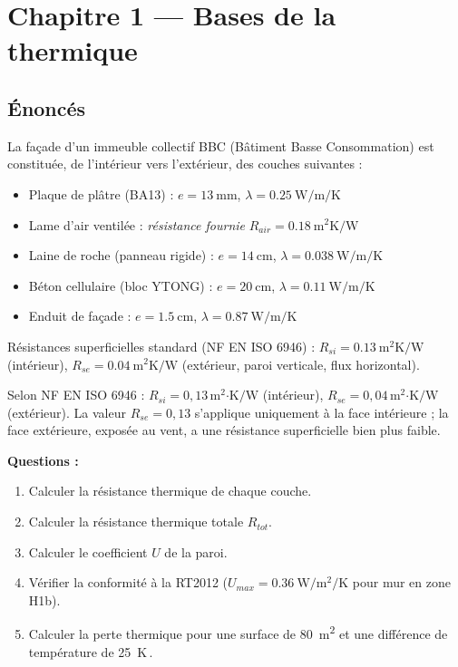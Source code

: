 \chapter*{Chapitre 1 — Bases de la thermique}

\section*{Énoncés}


La façade d'un immeuble collectif BBC (Bâtiment Basse Consommation) est constituée,
de l'intérieur vers l'extérieur, des couches suivantes :
\begin{itemize}
  \item Plaque de plâtre (BA13) : \(e = \SI{13}{\milli\meter}\), \(\lambda = \SI{0,25}{\watt\per\meter\per\kelvin}\)
  \item Lame d'air ventilée : \textit{résistance fournie} \(R_{air} = \SI{0,18}{\meter\squared\kelvin\per\watt}\)
  \item Laine de roche (panneau rigide) : \(e = \SI{14}{\centi\meter}\), \(\lambda = \SI{0,038}{\watt\per\meter\per\kelvin}\)
  \item Béton cellulaire (bloc YTONG) : \(e = \SI{20}{\centi\meter}\), \(\lambda = \SI{0,11}{\watt\per\meter\per\kelvin}\)
  \item Enduit de façade : \(e = \SI{1,5}{\centi\meter}\), \(\lambda = \SI{0,87}{\watt\per\meter\per\kelvin}\)
\end{itemize}

Résistances superficielles standard (NF EN ISO 6946) :
\(R_{si} = \SI{0,13}{\meter\squared\kelvin\per\watt}\) (intérieur),
\(R_{se} = \SI{0,04}{\meter\squared\kelvin\per\watt}\) (extérieur, paroi verticale, flux horizontal).

\begin{remarque}
Selon NF EN ISO 6946 : \(R_{si} = 0{,}13\,\text{m}^2\text{·K/W}\) (intérieur), \(R_{se} = 0{,}04\,\text{m}^2\text{·K/W}\) (extérieur). La valeur \(R_{se} = 0{,}13\) s'applique uniquement à la face intérieure ; la face extérieure, exposée au vent, a une résistance superficielle bien plus faible.
\end{remarque}

\textbf{Questions :}
\begin{enumerate}
  \item Calculer la résistance thermique de chaque couche.
  \item Calculer la résistance thermique totale \(R_{tot}\).
  \item Calculer le coefficient \(U\) de la paroi.
  \item Vérifier la conformité à la RT2012 (\(U_{max} = \SI{0,36}{\watt\per\meter\squared\per\kelvin}\) pour mur en zone H1b).
  \item Calculer la perte thermique pour une surface de \SI{80}{\meter\squared} et une
        différence de température de \SI{25}{\kelvin}\,.
\end{enumerate}

